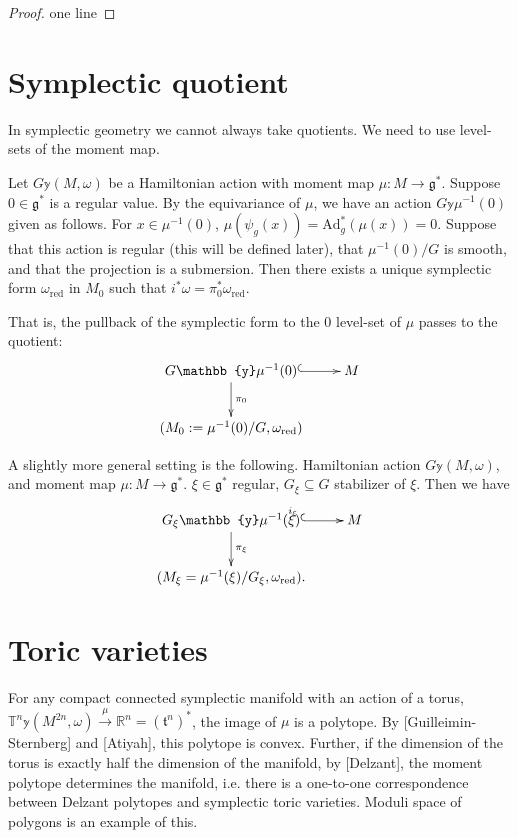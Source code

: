 \begin{proof}
one line
\end{proof}

\section{Symplectic quotient}
\label{section-symplectic-quotient}

\noindent
In symplectic geometry we cannot always take quotients.
We need to use level-sets of the moment map.

\begin{theorem}
\label{theorem-marsden-weinstein-megre}
Let $G \mathbb{y} (M,\omega)$ be a Hamiltonian action
with moment map $\mu:M \to \mathfrak{g}^*$.
Suppose $0 \in \mathfrak{g}^*$ is a regular value.
By the equivariance of $\mu$, we have an action $G \mathbb{y} \mu^{-1}(0)$
given as follows. For $x \in \mu^{-1}(0)$, 
$\mu(\psi_g(x))=\text{Ad}_g^*(\mu(x))=0$.
Suppose that this action is regular (this will be defined later),
that $\mu^{-1}(0)/G$ is smooth, and that the projection is a submersion.
Then there exists a unique symplectic form $\omega_{\text{red}}$ in $M_0$ 
such that $i^*\omega=\pi_0^*\omega_{\text{red}}$.
\end{theorem}

\noindent
That is, the pullback of the symplectic form to the 
0 level-set of $\mu$ passes to the quotient:
$$
\xymatrix{
G \mathbb{y} \mu^{-1}(0)\ar[d]^{\pi_0}\ar@{^{(}->}[r]& M\\
(M_0:=\mu^{-1}(0)/G,\omega_{\text{red}})
}
$$

\noindent
A slightly more general setting is the following.
Hamiltonian action $G \mathbb{y} (M,\omega)$,
and moment map
$\mu:M \to \mathfrak{g}^*$.
$\xi \in \mathfrak{g}^*$ regular, $G_\xi \subseteq G$
stabilizer of $\xi$.
Then we have
$$
\xymatrix{
G_\xi \mathbb{y} \mu^{-1}(\xi)\ar[d]^{\pi_\xi}\ar@{^{(}->}[r]^{i_\xi}& M\\
(M_\xi=\mu^{-1}(\xi)/G_\xi,\omega_{\text{red}}).
}
$$

\section{Toric varieties}
\label{section-toric-varieties}

\noindent
For any compact connected symplectic manifold with an action of a torus,
$\mathbb{T}^n \mathbb{y} (M^{2n},\omega)\xrightarrow{\mu}\mathbb{R}^n
=(\mathfrak{t}^n)^*$, the image of $\mu$
is a polytope. By [Guilleimin-Sternberg] and [Atiyah], this polytope is
convex. Further, if the dimension of the torus is exactly half
the dimension of the manifold, by [Delzant], the moment polytope
determines the manifold, i.e. there is a one-to-one
correspondence between
Delzant polytopes and symplectic toric varieties.
Moduli space of polygons is an example of this.

